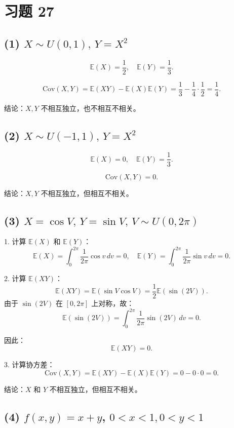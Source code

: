 \documentclass[twoside]{article}
\begin{document}
\section{习题 27}

\begin{ans}{27}{27}
\subsection*{(1) \( X \sim U(0, 1), \, Y = X^2 \)}

\[
\mathbb{E}(X) = \frac{1}{2}, \quad \mathbb{E}(Y) = \frac{1}{3}.
\]

\[
\text{Cov}(X, Y) = \mathbb{E}(XY) - \mathbb{E}(X)\mathbb{E}(Y) = \frac{1}{3} - \frac{1}{4} \cdot \frac{1}{2} = \frac{1}{4}.
\]

结论：\( X, Y \) 不相互独立，也不相互不相关。

\subsection*{(2) \( X \sim U(-1, 1), \, Y = X^2 \)}

\[
\mathbb{E}(X) = 0, \quad \mathbb{E}(Y) = \frac{1}{3}.
\]

\[
\text{Cov}(X, Y) = 0.
\]

结论：\( X, Y \) 不相互独立，但相互不相关。

\subsection*{(3) \( X = \cos V, \, Y = \sin V, \, V \sim U(0, 2\pi) \)}

1. 计算 \( \mathbb{E}(X) \) 和 \( \mathbb{E}(Y) \)：
\[
\mathbb{E}(X) = \int_{0}^{2\pi} \frac{1}{2\pi} \cos v \, dv = 0, \quad \mathbb{E}(Y) = \int_{0}^{2\pi} \frac{1}{2\pi} \sin v \, dv = 0.
\]

2. 计算 \( \mathbb{E}(XY) \)：
\[
\mathbb{E}(XY) = \mathbb{E}(\sin V \cos V) = \frac{1}{2} \mathbb{E}(\sin(2V)).
\]
由于 \( \sin(2V) \) 在 \( [0, 2\pi] \) 上对称，故：
\[
\mathbb{E}(\sin(2V)) = \int_{0}^{2\pi} \frac{1}{2\pi} \sin(2V) \, dv = 0.
\]

因此：
\[
\mathbb{E}(XY) = 0.
\]

3. 计算协方差：
\[
\text{Cov}(X, Y) = \mathbb{E}(XY) - \mathbb{E}(X) \mathbb{E}(Y) = 0 - 0 \cdot 0 = 0.
\]

结论：\( X \) 和 \( Y \) 不相互独立，但相互不相关。

\subsection*{(4) \( f(x, y) = x + y \), \( 0 < x < 1, 0 < y < 1 \)}


\end{ans}
\end{document}
